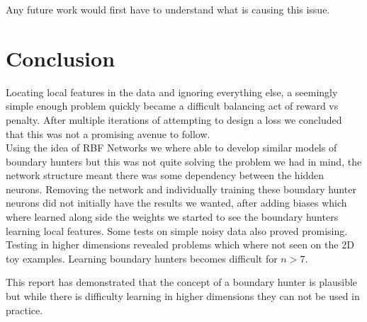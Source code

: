 \documentclass[notitlepage]{report}
\theoremstyle{definition}
\begin{document}
Any future work would first have to understand what is causing this issue. 

\chapter{Conclusion}
Locating local features in the data and ignoring everything else, a seemingly simple enough problem quickly became a difficult  balancing act of reward vs penalty. After multiple iterations of attempting to design a loss we concluded that this was not a promising avenue to follow.\\

Using the idea of RBF Networks we where able to develop similar models of boundary hunters but this was not quite solving the problem we had in mind, the network structure meant there was some dependency between the hidden neurons. Removing the network and individually training these boundary hunter neurons did not initially have the results we wanted, after adding biases which where learned along side the weights we started to see the boundary hunters learning local features. Some tests on simple noisy data also proved promising.\\

Testing in higher dimensions revealed problems which where not seen on the 2D toy examples. Learning boundary hunters becomes difficult for $n > 7$.

This report has demonstrated that the concept of a boundary hunter is plausible but while there is difficulty learning in higher dimensions they can not be used in practice.


\newpage


\end{document}
